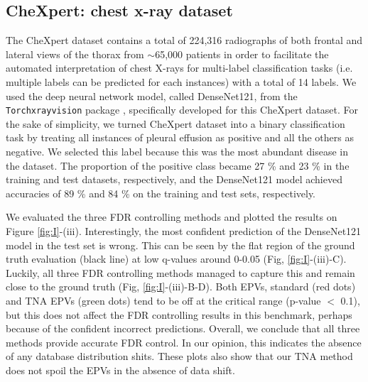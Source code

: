 \documentclass{article}
\begin{document}
\subsection{CheXpert: chest x-ray dataset}

The CheXpert dataset contains a total of 224,316 radiographs of both frontal and lateral views of the thorax from $\sim$65,000 patients in order to facilitate the automated interpretation of chest X-rays for multi-label classification tasks (i.e. multiple labels can be predicted for each instances) with a total of 14 labels. We used the deep neural network model, called DenseNet121, from the \texttt{Torchxrayvision} package \cite{cohen2020limits,Cohen2022xrv}, specifically developed for this CheXpert dataset. For the sake of simplicity, we turned CheXpert dataset into a binary classification task by treating all instances of pleural effusion as positive and all the others as negative. We selected this label because this was the most abundant disease in the dataset. The proportion of the positive class became 27 \% and 23 \% in the training and test datasets, respectively, and the DenseNet121 model achieved accuracies of 89 \% and 84 \% on the training and test sets, respectively.

We evaluated the three FDR controlling methods and plotted the results on Figure \ref{fig:I}-(iii). Interestingly, the most confident prediction of the DenseNet121 model in the test set is wrong. This can be seen by the flat region of the ground truth evaluation (black line) at low q-values around 0-0.05 (Fig, \ref{fig:I}-(iii)-C). Luckily, all three FDR controlling methods managed to capture this and remain close to the ground truth (Fig, \ref{fig:I}-(iii)-B-D). Both EPVs, standard (red dots) and TNA EPVs (green dots) tend to be off at the critical range (p-value $<$ 0.1), but this does not affect the FDR controlling results in this benchmark, perhaps because of the confident incorrect predictions. Overall, we conclude that all three methods provide accurate FDR control. In our opinion, this indicates the absence of any database distribution shits. These plots also show that our TNA method does not spoil the EPVs in the absence of data shift.
\end{document}
